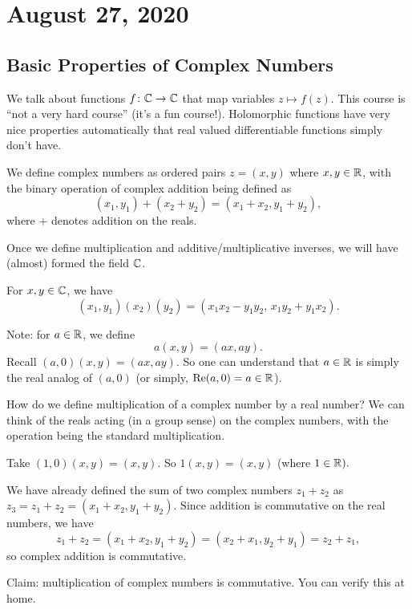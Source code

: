 \section{August 27, 2020}
\subsection{Basic Properties of Complex Numbers}
We talk about functions $ f \colon \mathbb{C} \to \mathbb{C}$ that map variables $z \mapsto f(z)$. This course is ``not a very hard course'' (it's a fun course!). Holomorphic functions have very nice properties automatically that real valued differentiable functions simply don't have.
\begin{definition}
    We define complex numbers as ordered pairs $z=(x,y)$ where $x,y \in \mathbb{R}$, with the binary operation of complex addition being defined as \[
        (x_1,y_1)+(x_2+y_2)=(x_1+x_2,y_1+y_2),
    \]
   where $+$ denotes addition on the reals. 
\end{definition}
Once we define multiplication and additive/multiplicative inverses, we will have (almost) formed the field $\mathbb{C}$. 
\begin{definition}
    For $x,y \in \mathbb{C}$, we have 
    \[
    (x_1,y_1)(x_2)(y_2)=(x_1x_2-y_1y_2,\,x_1y_2+y_1x_2).
    \]
\end{definition}
Note: for $a \in \mathbb{R}$, we define \[
    a(x,y)=(ax,ay).
\]
Recall $(a,0)(x,y)=(ax,ay).$ So one can understand that $a\in\mathbb{R}$ is simply the real analog of $(a,0)$ (or simply, $\operatorname{Re}(a,0)=a \in \mathbb{R}$).

How do we define multiplication of a complex number by a real number? We can think of the reals acting (in a group sense) on the complex numbers, with the operation being the standard multiplication.

\begin{example}
    Take $(1,0)(x,y)=(x,y).$ So $1(x,y)=(x,y)$ (where $1 \in \mathbb{R}).$
\end{example}

\begin{example}
    
We have already defined the sum of two complex numbers $z_1+z_2$ as $z_3=z_1+z_2=(x_1+x_2,y_1+y_2).$ Since addition is commutative on the real numbers, we have  \[
  z_1+z_2=(x_1+x_2,y_1+y_2)=(x_2+x_1,y_2+y_1)=z_2+z_1,
\]
so complex addition is commutative.
\end{example}

Claim: multiplication of complex numbers is commutative. You can verify this at home.

